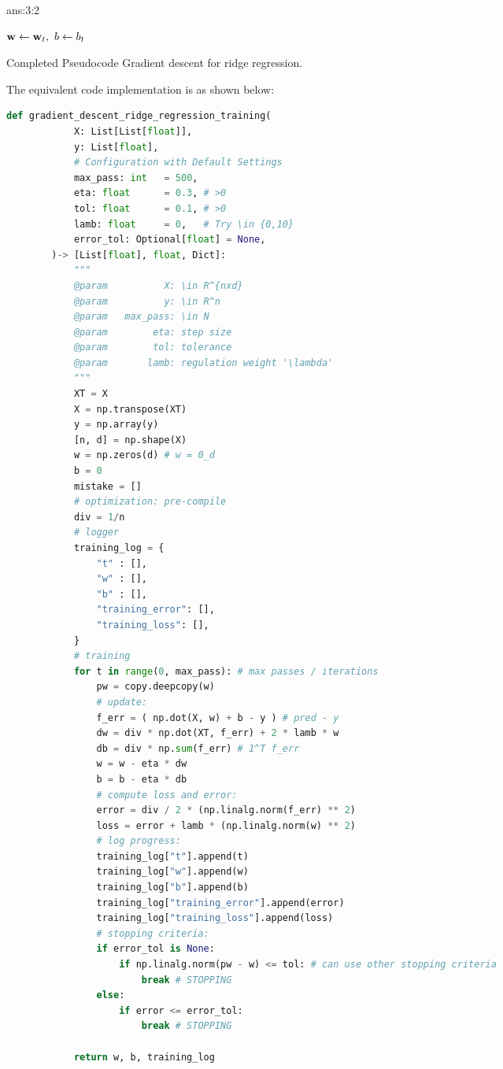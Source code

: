 \documentclass{tron}
\begin{document}
\begin{answer}[]{ans:3:2}
\begin{algorithm}[H]


	$\mathbf{w} \gets \mathbf{w}_t, ~ b \gets b_t$
	\caption{Completed Pseudocode Gradient descent for ridge regression.}
	\label{alg:rr}
\end{algorithm}

The equivalent code implementation is as shown below:


	\begin{lstlisting}[language=python]		
		def gradient_descent_ridge_regression_training(
		    X: List[List[float]], 
		    y: List[float], 
		    # Configuration with Default Settings
		    max_pass: int   = 500,
		    eta: float      = 0.3, # >0
		    tol: float      = 0.1, # >0
		    lamb: float     = 0,   # Try \in {0,10}
		    error_tol: Optional[float] = None,
		)-> [List[float], float, Dict]:
		    """
		    @param          X: \in R^{nxd}
		    @param          y: \in R^n 
		    @param   max_pass: \in N
		    @param        eta: step size
		    @param        tol: tolerance
		    @param       lamb: regulation weight '\lambda'
		    """
		    XT = X
		    X = np.transpose(XT)
		    y = np.array(y)
		    [n, d] = np.shape(X) 
		    w = np.zeros(d) # w = 0_d
		    b = 0
		    mistake = []
		    # optimization: pre-compile
		    div = 1/n 
		    # logger
		    training_log = {
		        "t" : [],
		        "w" : [],
		        "b" : [],
		        "training_error": [],
		        "training_loss": [],
		    }
		    # training
		    for t in range(0, max_pass): # max passes / iterations
		        pw = copy.deepcopy(w)
		        # update:
		        f_err = ( np.dot(X, w) + b - y ) # pred - y
		        dw = div * np.dot(XT, f_err) + 2 * lamb * w
		        db = div * np.sum(f_err) # 1^T f_err
		        w = w - eta * dw
		        b = b - eta * db
		        # compute loss and error:
		        error = div / 2 * (np.linalg.norm(f_err) ** 2)
		        loss = error + lamb * (np.linalg.norm(w) ** 2)
		        # log progress:
		        training_log["t"].append(t)
		        training_log["w"].append(w)
		        training_log["b"].append(b)
		        training_log["training_error"].append(error)
		        training_log["training_loss"].append(loss)
		        # stopping criteria:
		        if error_tol is None:
		            if np.linalg.norm(pw - w) <= tol: # can use other stopping criteria
		                break # STOPPING
		        else:
		            if error <= error_tol:
		                break # STOPPING
		    
		    return w, b, training_log
	\end{lstlisting}
    
\end{answer}
\end{document}
